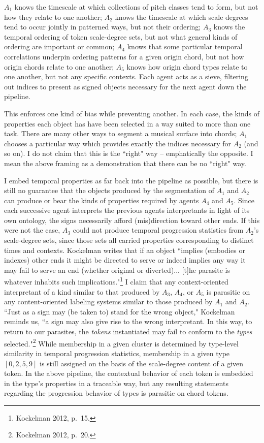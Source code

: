 $A_1$ knows the timescale at which collections of pitch classes tend to form, but not how they relate to one another; $A_2$ knows the timescale at which scale degrees tend to occur jointly in patterned ways, but not their ordering; $A_3$ knows the temporal ordering of token scale-degree sets, but not what general kinds of ordering are important or common; $A_4$ knows that some particular temporal correlations underpin ordering patterns for a given origin chord, but not how origin chords relate to one another; $A_5$ knows how origin chord types relate to one another, but not any specific contexts.  Each agent acts as a sieve, filtering out indices to present as signed objects necessary for the next agent down the pipeline.

This enforces one kind of bias while preventing another.  In each case, the kinds of properties each object has have been selected in a way suited to more than one task.  There are many other ways to segment a musical surface into chords; $A_1$ chooses a particular way which provides exactly the indices necessary for $A_2$ (and so on).  I do not claim that this is the ``right" way -- emphatically the opposite.  I mean the above framing as a demonstration that there can be no ``right" way.

I embed temporal properties as far back into the pipeline as possible, but there is still no guarantee that the objects produced by the segmentation of $A_1$ and $A_2$ can produce or bear the kinds of properties required by agents $A_4$ and $A_5$.  Since each successive agent interprets the previous agents interpretants in light of its own ontology, the signs necessarily afford (mis)direction toward other ends.  If this were not the case, $A_3$ could not produce temporal progression statistics from $A_2$'s scale-degree sets, since those sets all carried properties corresponding to distinct times and contexts.  Kockelman writes that if an object ``implies (embodies or indexes) other ends it might be directed to serve or indeed implies any way it may fail to serve an end (whether original or diverted)... [t]he parasite is whatever inhabits such implications."\footnote{Kockelman 2012, p.\ 15.}  I claim that any context-oriented interpretant of a kind similar to that produced by $A_3$, $A_4$, or $A_5$ is parasitic on any content-oriented labeling systems similar to those produced by $A_1$ and $A_2$.  ``Just as a sign may (be taken to) stand for the wrong object," Kockelman reminds us, ``a  sign may also give rise to the wrong interpretant.  In this way, to return to our parasites, the \emph{tokens} instantiated may fail to conform to the \emph{types} selected."\footnote{Kockelman 2012, p.\ 20.}  While membership in a given cluster is determined by type-level similarity in temporal progression statistics, membership in a given type $[0,2,5,9]$ is still assigned on the basis of the scale-degree content of a given token.  In the above pipeline, the contextual behavior of each token is embedded in the type's properties in a traceable way, but any resulting statements regarding the progression behavior of types is parasitic on chord tokens.

